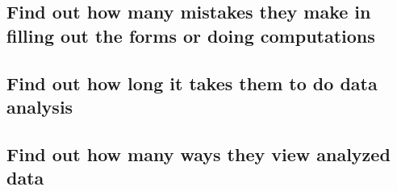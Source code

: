 \subsection{Find out how many mistakes they make in filling out the forms or doing computations}
\subsection{Find out how long it takes them to do data analysis}
\subsection{Find out how many ways they view analyzed data}

\newpage
\nocite{Humphrey95,Ceberio-Verghese96,Tomayko96,CMU95}





